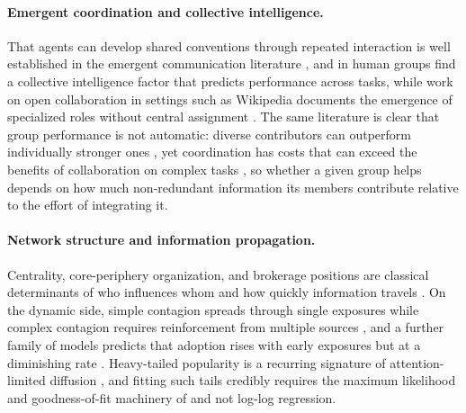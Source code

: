 \documentclass{article}
\begin{document}
\paragraph{Emergent coordination and collective intelligence.}
That agents can develop shared conventions through repeated interaction is well established in the emergent communication literature \citep{lazaridou2020emergent, mordatch2018emergence}, and in human groups \citet{woolley2010evidence} find a collective intelligence factor that predicts performance across tasks, while work on open collaboration in settings such as Wikipedia documents the emergence of specialized roles without central assignment \citep{kittur2007harnessing}. The same literature is clear that group performance is not automatic: diverse contributors can outperform individually stronger ones \citep{hong2004diverse}, yet coordination has costs that can exceed the benefits of collaboration on complex tasks \citep{straub2023coordination}, so whether a given group helps depends on how much non-redundant information its members contribute relative to the effort of integrating it.

\paragraph{Network structure and information propagation.}
Centrality, core-periphery organization, and brokerage positions are classical determinants of who influences whom and how quickly information travels \citep{freeman1977centrality, borgatti2000coreperiphery, guimera2005functional}. On the dynamic side, simple contagion spreads through single exposures while complex contagion requires reinforcement from multiple sources \citep{centola2007complex}, and a further family of models predicts that adoption rises with early exposures but at a diminishing rate \citep{dodds2004universal}. Heavy-tailed popularity is a recurring signature of attention-limited diffusion \citep{weng2012competition}, and fitting such tails credibly requires the maximum likelihood and goodness-of-fit machinery of \citet{clauset2009power} and not log-log regression.
\end{document}
